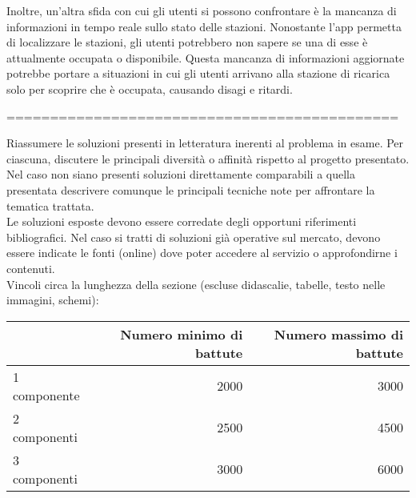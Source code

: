 Inoltre, un'altra sfida con cui gli utenti si possono confrontare è la mancanza di informazioni in tempo reale sullo stato delle stazioni. Nonostante l'app permetta di localizzare le stazioni, gli utenti potrebbero non sapere se una di esse è attualmente occupata o disponibile. Questa mancanza di informazioni aggiornate potrebbe portare a situazioni in cui gli utenti arrivano alla stazione di ricarica solo per scoprire che è occupata, causando disagi e ritardi.

=============================================

Riassumere le soluzioni presenti in letteratura inerenti al problema in esame. Per ciascuna, discutere le principali diversità o affinità rispetto al progetto presentato. Nel caso non siano presenti soluzioni direttamente comparabili a quella presentata descrivere comunque le principali tecniche note per affrontare la tematica trattata.\\

Le soluzioni esposte devono essere corredate degli opportuni riferimenti bibliografici. Nel caso si tratti di soluzioni già operative sul mercato, devono essere indicate le fonti (online) dove poter accedere al servizio o approfondirne i contenuti.\\


Vincoli circa la lunghezza della sezione (escluse didascalie, tabelle, testo nelle immagini, schemi):

\vspace{1cm}
\begin{tabular}{l|rr}
                 & Numero minimo di battute & Numero massimo di battute \\
    \hline
    1 componente & 2000                     & 3000                      \\
    2 componenti & 2500                     & 4500                      \\
    3 componenti & 3000                     & 6000                      \\
    \hline
\end{tabular}


\newpage
